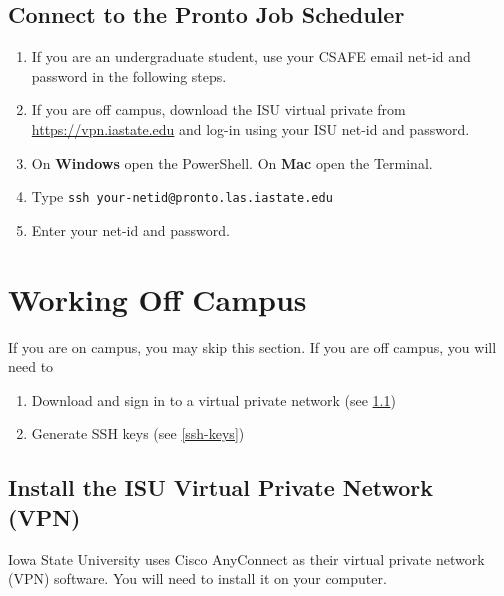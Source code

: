 \documentclass[
]{book}
\providecommand{\tightlist}{%
  \setlength{\itemsep}{0pt}\setlength{\parskip}{0pt}}
\begin{document}
\hypertarget{connect-to-the-pronto-job-scheduler}{%
\subsection{Connect to the Pronto Job Scheduler}\label{connect-to-the-pronto-job-scheduler}}

\begin{enumerate}
\def\labelenumi{\arabic{enumi}.}
\tightlist
\item
  If you are an undergraduate student, use your CSAFE email net-id and password in the following steps.
\item
  If you are off campus, download the ISU virtual private from \url{https://vpn.iastate.edu} and log-in using your ISU net-id and password.
\item
  On \textbf{Windows} open the PowerShell. On \textbf{Mac} open the Terminal.
\item
  Type \texttt{ssh\ your-netid@pronto.las.iastate.edu}
\item
  Enter your net-id and password.
\end{enumerate}

\hypertarget{off-campus}{%
\section{Working Off Campus}\label{off-campus}}

If you are on campus, you may skip this section. If you are off campus, you will need to

\begin{enumerate}
\def\labelenumi{\arabic{enumi}.}
\tightlist
\item
  Download and sign in to a virtual private network (see \ref{install-vpn})
\item
  Generate SSH keys (see \ref{ssh-keys})
\end{enumerate}

\hypertarget{install-vpn}{%
\subsection{Install the ISU Virtual Private Network (VPN)}\label{install-vpn}}

Iowa State University uses Cisco AnyConnect as their virtual private network (VPN) software. You will need to install it on your computer.
\end{document}
